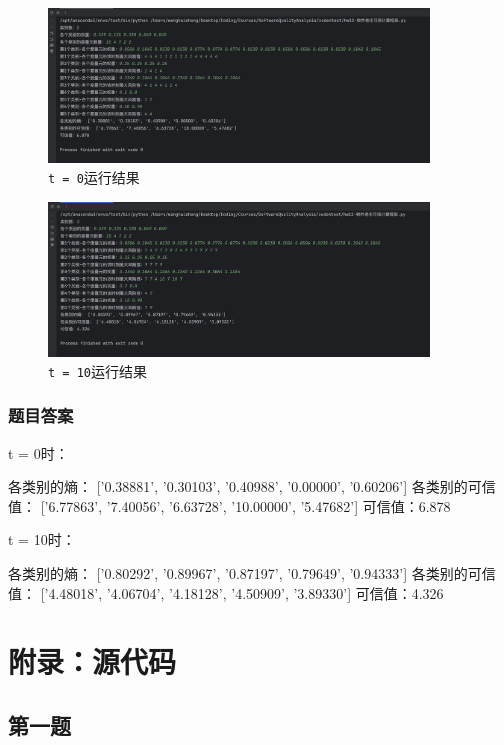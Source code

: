 \documentclass{article}
\begin{document}
\begin{figure}[H]
	\centering
	\includegraphics[width=0.9\textwidth]{img/0301.png}
	\caption{\texttt{t = 0}运行结果}
\end{figure}

\begin{figure}[H]
	\centering
	\includegraphics[width=0.9\textwidth]{img/0302.png}
	\caption{\texttt{t = 10}运行结果}
\end{figure}

\subsubsection{题目答案}

t = 0时：

各类别的熵： ['0.38881', '0.30103', '0.40988', '0.00000', '0.60206']
各类别的可信值： ['6.77863', '7.40056', '6.63728', '10.00000', '5.47682']
可信值：6.878

t = 10时：

各类别的熵： ['0.80292', '0.89967', '0.87197', '0.79649', '0.94333']
各类别的可信值： ['4.48018', '4.06704', '4.18128', '4.50909', '3.89330']
可信值：4.326

\section{附录：源代码}

\subsection{第一题}
\end{document}
